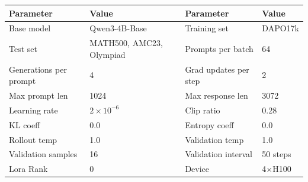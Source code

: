 \documentclass{article}
\theoremstyle{plain}
\theoremstyle{definition}
\theoremstyle{remark}
\begin{document}
\begin{table}[h]
  \centering
  \label{tab:config-4b}
  \begin{tcolorbox}[
    enhanced, hbox,
    title={Training setup of Qwen3-4B-Base},
    colback=teal!5, colframe=teal, coltext=black, coltitle=white,
    fonttitle=\bfseries, arc=1mm, boxrule=1pt, boxsep=1pt,
    left=2pt, right=2pt, top=0pt, bottom=2pt,
    toptitle=3pt, bottomtitle=3pt, center
  ]
    \small
    \renewcommand{\arraystretch}{1.2}
    \setlength{\tabcolsep}{8pt}
    \begin{tabular}{l|l|l|l}
      \textbf{Parameter} & \textbf{Value} & \textbf{Parameter} & \textbf{Value} \\
      \hline
      Base model & Qwen3-4B-Base & Training set & DAPO17k \\
      Test set & MATH500, AMC23, Olympiad & Prompts per batch & 64 \\
      Generations per prompt & 4 & Grad updates per step & 2 \\
      Max prompt len & 1024 & Max response len & 3072 \\
      Learning rate & $2 \times 10^{-6}$ & Clip ratio & 0.28 \\
      KL coeff & 0.0 & Entropy coeff & 0.0 \\
      Rollout temp & 1.0 & Validation temp & 1.0 \\
      Validation samples & 16 & Validation interval & 50 steps \\
      Lora Rank & 0 & Device & 4$\times$H100 \\
    \end{tabular}
  \end{tcolorbox}
\end{table}
\end{document}
